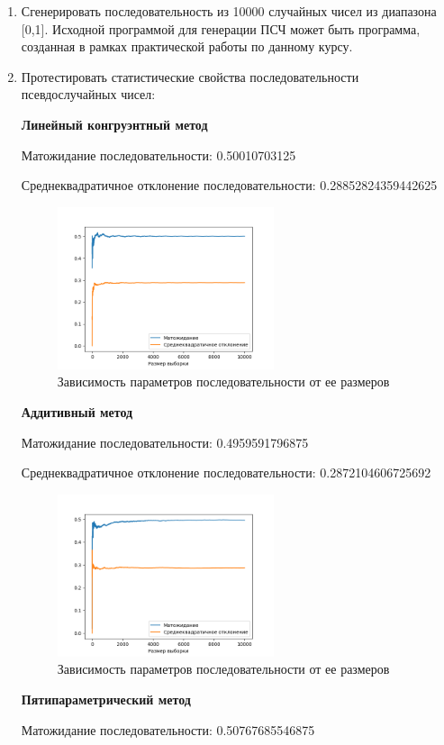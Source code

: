 \documentclass[spec, och, labwork]{shiza}
\begin{document}
\begin{enumerate}
  \item Сгенерировать последовательность из 10000 случайных чисел из диапазона [0,1]. Исходной программой для генерации ПСЧ может быть программа, созданная в рамках практической работы по данному курсу.
  \item Протестировать статистические свойства последовательности псевдослучайных чисел:
  \begin{center}
    \textbf{Линейный конгруэнтный метод}
  \end{center}
  Матожидание последовательности: 0.50010703125
  
  Среднеквадратичное отклонение последовательности: 0.28852824359442625
  \begin{figure}[H]
    \centering
    \includegraphics[width=0.6\textwidth]{pic/lc}
    \caption{Зависимость параметров последовательности от ее размеров}
    \label{fig:img1}
  \end{figure}
  \begin{center}
    \textbf{Аддитивный метод}
  \end{center}
  Матожидание последовательности: 0.4959591796875

  Среднеквадратичное отклонение последовательности: 0.2872104606725692
  \begin{figure}[H]
    \centering
    \includegraphics[width=0.6\textwidth]{pic/add}
    \caption{Зависимость параметров последовательности от ее размеров}
    \label{fig:img1}
  \end{figure}
  \begin{center}
    \textbf{Пятипараметрический метод}
  \end{center}
  Матожидание последовательности: 0.50767685546875


\end{enumerate}
\end{document}

